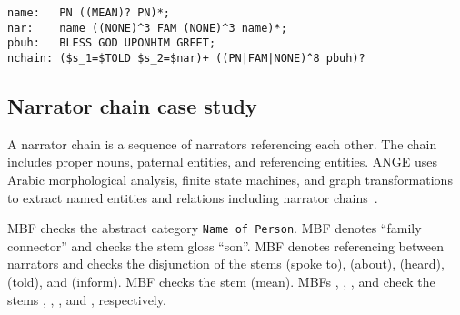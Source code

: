 \setarab
\begin{table}[tb!]
  \centering
  \caption{Narrator chain example.}
  \begin{Verbatim}[xleftmargin=1.5cm,fontsize=\relsize{-1},commandchars=\\\{\},codes={\catcode`$=3 \catcode`_=8}]
name:   PN ((MEAN)? PN)*;
nar:    name ((NONE)^3 FAM (NONE)^3 name)*;
pbuh:   BLESS GOD UPONHIM GREET;
nchain: ($s_1=$TOLD $s_2=$nar)+ ((PN|FAM|NONE)^8 pbuh)?
\end{Verbatim}
  \label{tab:nchain}%
\end{table}%

\subsection{Narrator chain case study}
A narrator chain is a sequence of narrators referencing each other. 
The chain includes proper nouns, paternal entities, and referencing entities. 
ANGE uses Arabic morphological analysis, finite state machines, and graph transformations 
to extract named entities and relations including narrator chains~\cite{ZaMaFlairs2012HadithBio}.

\transfalse
MBF  checks the abstract category {\tt Name of Person}. 
MBF  denotes ``family connector'' and checks the stem gloss ``son''. 
MBF  denotes referencing between narrators and checks the disjunction of 
the stems (spoke to), (about), (heard), (told), and (inform). 
MBF  checks the stem (mean). 
MBFs , , , and  check the 
stems , , , and , respectively. 
\transtrue

